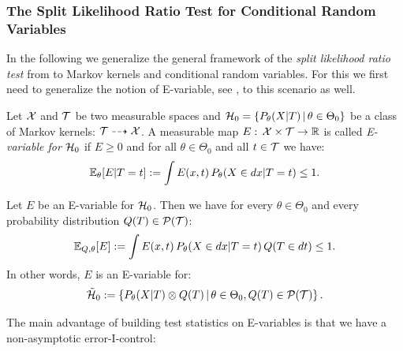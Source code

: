 \subsubsection{The Split Likelihood Ratio Test for Conditional Random Variables}

In the following we generalize the general framework of the \emph{split likelihood ratio test} from \cite{WRB20} to Markov kernels and conditional random variables. For this we first need to generalize the notion of E-variable, see \cite{GHK20}, to this scenario as well.

\begin{Def}[E-variable]
    \label{def:e-variable}
    Let $\mathcal{X}$ and $\mathcal{T}$ be two measurable spaces and $\mathcal{H}_0=\left \{ P_\theta(X|T) \,\middle|\, \theta \in \Theta_0 \right \}$
    be a class of Markov kernels: $\mathcal{T} \dashrightarrow \mathcal{X}$.
    A measurable map $E:\, \mathcal{X} \times \mathcal{T} \to \mathbb{R}$ is called \emph{E-variable for $\mathcal{H}_0$} if $E \ge 0$ and 
    for all $\theta \in \Theta_0$ and all $t \in \mathcal{T}$ we have:
    \[ \mathbb{E}_\theta[E|T=t] :=  \int E(x,t) \, P_\theta(X \in dx|T=t) \le 1.   \]
\end{Def}

\begin{Rem}
    Let $E$ be an E-variable for $\mathcal{H}_0$. 
    Then we have for every $\theta \in \Theta_0$ and every probability distribution $Q(T) \in \mathcal{P}(\mathcal{T})$:
    \[ \mathbb{E}_{Q,\theta}[E] :=  \int E(x,t) \, P_\theta(X \in dx|T=t) \, Q(T \in dt) \le 1.   \]
    In other words, $E$ is an E-variable for:
    \[\tilde {\mathcal{H}}_0 := \left \{ P_\theta(X|T)\otimes Q(T) \,\middle|\, \theta \in \Theta_0, Q(T) \in \mathcal{P}(\mathcal{T}) \right \}.\]
\end{Rem}

The main advantage of building test statistics on E-variables is that we have a non-asymptotic error-I-control:


